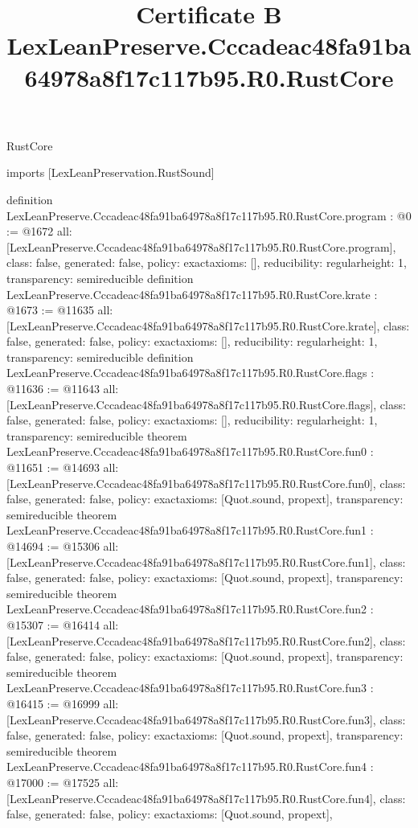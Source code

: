 \begin{lexlean}{RustCore}
\title{Certificate B LexLeanPreserve.Cccadeac48fa91ba64978a8f17c117b95.R0.RustCore}
\begin{coremodule}
imports [LexLeanPreservation.RustSound]

definition LexLeanPreserve.Cccadeac48fa91ba64978a8f17c117b95.R0.RustCore.program : @0 := @1672 {
  all: [LexLeanPreserve.Cccadeac48fa91ba64978a8f17c117b95.R0.RustCore.program],
  class: false,
  generated: false,
  policy: exact{axioms: []},
  reducibility: regular{height: 1},
  transparency: semireducible
}
definition LexLeanPreserve.Cccadeac48fa91ba64978a8f17c117b95.R0.RustCore.krate : @1673 := @11635 {
  all: [LexLeanPreserve.Cccadeac48fa91ba64978a8f17c117b95.R0.RustCore.krate],
  class: false,
  generated: false,
  policy: exact{axioms: []},
  reducibility: regular{height: 1},
  transparency: semireducible
}
definition LexLeanPreserve.Cccadeac48fa91ba64978a8f17c117b95.R0.RustCore.flags : @11636 := @11643 {
  all: [LexLeanPreserve.Cccadeac48fa91ba64978a8f17c117b95.R0.RustCore.flags],
  class: false,
  generated: false,
  policy: exact{axioms: []},
  reducibility: regular{height: 1},
  transparency: semireducible
}
theorem LexLeanPreserve.Cccadeac48fa91ba64978a8f17c117b95.R0.RustCore.fun0 : @11651 := @14693 {
  all: [LexLeanPreserve.Cccadeac48fa91ba64978a8f17c117b95.R0.RustCore.fun0],
  class: false,
  generated: false,
  policy: exact{axioms: [Quot.sound, propext]},
  transparency: semireducible
}
theorem LexLeanPreserve.Cccadeac48fa91ba64978a8f17c117b95.R0.RustCore.fun1 : @14694 := @15306 {
  all: [LexLeanPreserve.Cccadeac48fa91ba64978a8f17c117b95.R0.RustCore.fun1],
  class: false,
  generated: false,
  policy: exact{axioms: [Quot.sound, propext]},
  transparency: semireducible
}
theorem LexLeanPreserve.Cccadeac48fa91ba64978a8f17c117b95.R0.RustCore.fun2 : @15307 := @16414 {
  all: [LexLeanPreserve.Cccadeac48fa91ba64978a8f17c117b95.R0.RustCore.fun2],
  class: false,
  generated: false,
  policy: exact{axioms: [Quot.sound, propext]},
  transparency: semireducible
}
theorem LexLeanPreserve.Cccadeac48fa91ba64978a8f17c117b95.R0.RustCore.fun3 : @16415 := @16999 {
  all: [LexLeanPreserve.Cccadeac48fa91ba64978a8f17c117b95.R0.RustCore.fun3],
  class: false,
  generated: false,
  policy: exact{axioms: [Quot.sound, propext]},
  transparency: semireducible
}
theorem LexLeanPreserve.Cccadeac48fa91ba64978a8f17c117b95.R0.RustCore.fun4 : @17000 := @17525 {
  all: [LexLeanPreserve.Cccadeac48fa91ba64978a8f17c117b95.R0.RustCore.fun4],
  class: false,
  generated: false,
  policy: exact{axioms: [Quot.sound, propext]},
}
\end{coremodule}
\end{lexlean}
